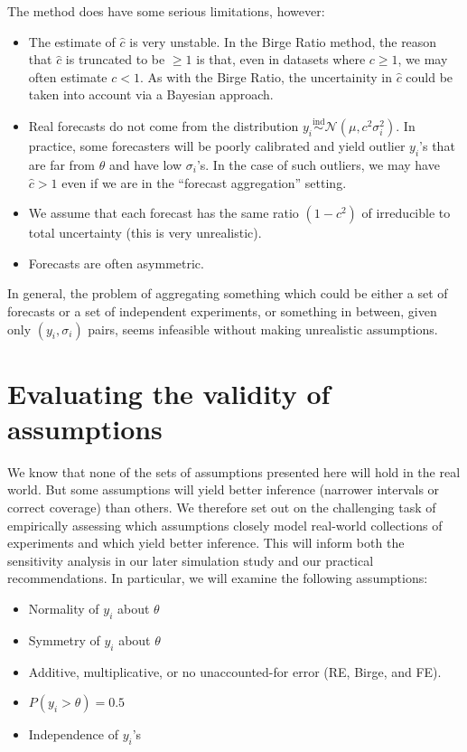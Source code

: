 \documentclass[letterpaper,12pt]{article}
\begin{document}
The method does have some serious limitations, however:
\begin{itemize}
  \item The estimate of $\hat c$ is very unstable. In the Birge Ratio method, the reason that $\hat c$ is truncated to be $\geq1$ is that, even in datasets where $c\geq 1$, we may often estimate $c<1$. As with the Birge Ratio, the uncertainity in $\hat c$ could be taken into account via a Bayesian approach.
  \item Real forecasts do not come from the distribution $y_i\overset{\mathrm{ind}}{\sim}\mathcal{N}(\mu,c^2\sigma_i^2)$. In practice, some forecasters will be poorly calibrated and yield outlier $y_i$'s that are far from $\theta$ and have low $\sigma_i$'s. In the case of such outliers, we may have $\hat c>1$ even if we are in the ``forecast aggregation'' setting.
  \item We assume that each forecast has the same ratio $(1-c^2)$ of irreducible to total uncertainty (this is very unrealistic).
  \item Forecasts are often asymmetric.
\end{itemize}

In general, the problem of aggregating something which could be either a set of forecasts or a set of independent experiments, or something in between, given only $(y_i,\sigma_i)$ pairs, seems infeasible without making unrealistic assumptions.

\section{Evaluating the validity of assumptions}\label{sec:assumptions}

We know that none of the sets of assumptions presented here will hold in the real world. But some assumptions will yield better inference (narrower intervals or correct coverage) than others. We therefore set out on the challenging task of empirically assessing which assumptions closely model real-world collections of experiments and which yield better inference. This will inform both the sensitivity analysis in our later simulation study and our practical recommendations. In particular, we will examine the following assumptions:

\begin{itemize}

\item
  Normality of $y_i$ about $\theta$
\item
  Symmetry of $y_i$ about $\theta$
\item
  Additive, multiplicative, or no unaccounted-for error (RE, Birge, and FE).
\item
  $P(y_i>\theta)=0.5$
\item
  Independence of $y_i$'s
\end{itemize}
\end{document}
